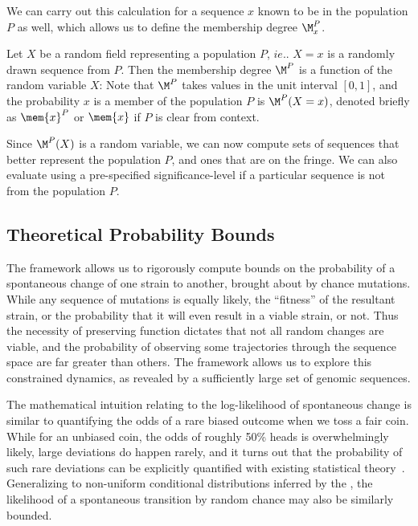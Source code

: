 {We can carry out this calculation for a sequence $x$  known to be in the population $P$ as well, which allows us to define the membership degree $\M^P_x$.
\begin{defn}
Let $X$ be a random field representing a population $P$, $ie.$. $X=x$ is a randomly drawn sequence from $P$. Then  the membership degree $\M^P$ is  a function of the random variable $X$: 
Note that $\M^P$ takes values in the unit interval $[0,1]$, and the probability  $x$ is a member of the population $P$ is $\M^P(X=x)$, denoted briefly as $\mem{x}^P$ or $\mem{x}$ if $P$ is clear from context.
\end{defn}
Since $\M^P(X)$ is a random variable, we can now compute sets of sequences that better represent the population $P$, and ones that are on the fringe. We can also evaluate using a pre-specified significance-level if a particular sequence is not from the population $P$.



\subsection*{Theoretical Probability Bounds}

The \tnet framework  allows us to rigorously compute bounds on the probability of a spontaneous change of one strain to another, brought about by chance mutations. While any sequence of mutations is equally likely, the ``fitness'' of the resultant strain, or the probability that it will even result in a viable strain, or not. Thus the necessity of preserving  function  dictates that not all random changes  are viable, and the probability of observing some trajectories through the sequence space  are far greater  than others. The \tnet framework allows us to explore this constrained dynamics, as revealed by a sufficiently large set of genomic sequences.



The mathematical intuition  relating  \qdist  to the log-likelihood of spontaneous change  is similar to quantifying the  odds of  a rare biased outcome when we  toss a fair coin.
While for an unbiased coin, the odds of roughly 50\% heads is overwhelmingly likely, large deviations do happen rarely, and it turns out that the probability of such rare deviations can be explicitly quantified with existing statistical theory~\cite{varadhan2010large}.
 Generalizing to non-uniform conditional distributions inferred by the \tnet, the likelihood of a spontaneous transition  by random chance may also be similarly bounded.


}
